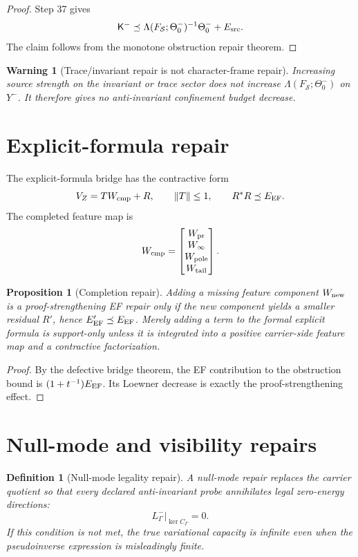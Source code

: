\documentclass[11pt]{article}
\newtheorem{proposition}[theorem]{Proposition}
\newtheorem{definition}[theorem]{Definition}
\newtheorem{warning}[theorem]{Warning}
\newcommand{\Kminus}{\mathsf K^-}
\newcommand{\ThetaZero}{\Theta^-_0}
\newcommand{\EEF}{E_{\rm EF}}
\newcommand{\Esrc}{E_{\rm src}}
\newcommand{\Loewner}{\preceq}
\begin{document}
\begin{proof}
Step 37 gives
\[
  \Kminus\Loewner \Lambda(F_{\mathcal S};\ThetaZero)^{-1}\ThetaZero+\Esrc.
\]
The claim follows from the monotone obstruction repair theorem.
\end{proof}

\begin{warning}[Trace/invariant repair is not character-frame repair]
Increasing source strength on the invariant or trace sector does not increase $\Lambda(F_{\mathcal S};\ThetaZero)$ on $Y^-$.  It therefore gives no anti-invariant confinement budget decrease.
\end{warning}

\section{Explicit-formula repair}

The explicit-formula bridge has the contractive form
\[
  V_Z=T W_{\rm cmp}+R,
  \qquad \|T\|\le 1,
  \qquad R^*R\Loewner\EEF.
\]
The completed feature map is
\[
  W_{\rm cmp}=\begin{bmatrix}W_{\rm pr}\\W_\infty\\W_{\rm pole}\\W_{\rm tail}\end{bmatrix}.
\]

\begin{proposition}[Completion repair]
Adding a missing feature component $W_{\rm new}$ is a proof-strengthening EF repair only if the new component yields a smaller residual $R'$, hence $\EEF'\Loewner \EEF$.  Merely adding a term to the formal explicit formula is support-only unless it is integrated into a positive carrier-side feature map and a contractive factorization.
\end{proposition}

\begin{proof}
By the defective bridge theorem, the EF contribution to the obstruction bound is $(1+t^{-1})\EEF$.  Its Loewner decrease is exactly the proof-strengthening effect.
\end{proof}

\section{Null-mode and visibility repairs}

\begin{definition}[Null-mode legality repair]
A null-mode repair replaces the carrier quotient so that every declared anti-invariant probe annihilates legal zero-energy directions:
\[
  L^-_\Gamma|_{\ker C_\Gamma}=0.
\]
If this condition is not met, the true variational capacity is infinite even when the pseudoinverse expression is misleadingly finite.
\end{definition}
\end{document}
